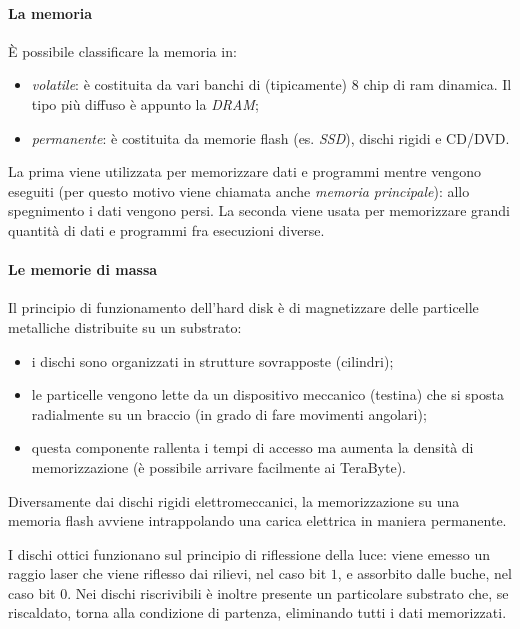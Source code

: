 \documentclass[class=book, crop=false, oneside]{standalone}
\begin{document}
\paragraph*{La memoria}
\`{E} possibile classificare la memoria in:
\begin{itemize}
	\item \emph{volatile}: è costituita da vari banchi di (tipicamente) \(8\) chip di \acrshort{ram} dinamica. Il tipo più diffuso è appunto la \emph{DRAM};
	\item \emph{permanente}: è costituita da memorie flash (es. \emph{SSD}), dischi rigidi e CD/DVD.
\end{itemize}
La prima viene utilizzata per memorizzare dati e programmi mentre vengono eseguiti (per questo motivo viene chiamata anche \emph{memoria principale}): allo spegnimento i dati vengono persi.
La seconda viene usata per memorizzare grandi quantità di dati e programmi fra esecuzioni diverse.

\paragraph{Le memorie di massa}
Il principio di funzionamento dell'hard disk è di magnetizzare delle particelle metalliche distribuite su un substrato:
\begin{itemize}[noitemsep]
	\item i dischi sono organizzati in strutture sovrapposte (cilindri);
	\item le particelle vengono lette da un dispositivo meccanico (testina) che si sposta radialmente su un braccio (in grado di fare movimenti angolari);
	\item questa componente rallenta i tempi di accesso ma aumenta la densità di memorizzazione (è possibile arrivare facilmente ai TeraByte).
\end{itemize}
Diversamente dai dischi rigidi elettromeccanici, la memorizzazione su una memoria flash avviene intrappolando una carica elettrica in maniera permanente.

I dischi ottici funzionano sul principio di riflessione della luce: viene emesso un raggio laser che viene riflesso dai rilievi, nel caso bit \(1\), e assorbito dalle buche, nel caso bit \(0\).
Nei dischi riscrivibili è inoltre presente un particolare substrato che, se riscaldato, torna alla condizione di partenza, eliminando tutti i dati memorizzati.
\end{document}
